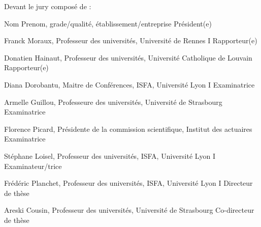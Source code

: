 \begin{titlepage}
\fontsize{11pt}{13pt}\selectfont
Devant le jury compos\'e de :
\medskip

\fontsize{9pt}{11pt}\selectfont

Nom Prenom, grade/qualit\'e, \'etablissement/entreprise \hfill Pr\'esident(e)

\medskip

Franck Moraux, Professeur des universit\'es, Universit\'e de Rennes I \hfill  Rapporteur(e)

Donatien Hainaut,  Professeur des universit\'es, Universit\'e Catholique de Louvain \hfill Rapporteur(e)

Diana Dorobantu, Maitre de Conf\'erences, ISFA, Universit\'e Lyon I \hfill Examinatrice

Armelle Guillou, Professeure des universit\'es, Universit\'e de Strasbourg \hfill Examinatrice

Florence Picard, Pr\'esidente de la commission scientifique, Institut des actuaires \hfill Examinatrice

St\'ephane Loisel, Professeur des universit\'es, ISFA, Universit\'e Lyon I \hfill Examinateur/trice

\medskip

Fr\'ed\'eric Planchet, Professeur des universit\'es, ISFA, Universit\'e Lyon I \hfill Directeur de thèse

Areski Cousin, Professeur des universit\'es, Universit\'e de Strasbourg \hfill Co-directeur de thèse %

\newpage
\end{titlepage}


